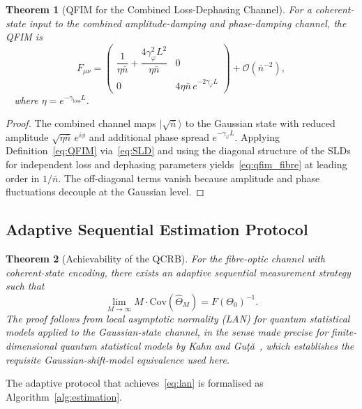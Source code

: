 \documentclass[journal,twocolumn]{IEEEtran}
\theoremstyle{definition}
\theoremstyle{plain}
\newtheorem{theorem}{Theorem}[section]
\begin{document}
\begin{theorem}[QFIM for the Combined Loss-Dephasing Channel]
\label{thm:qfim_fibre}
For a coherent-state input to the combined amplitude-damping and
phase-damping channel, the QFIM is
\begin{equation}
  F_{\mu\nu} =
  \begin{pmatrix}
    \dfrac{1}{\eta\bar n} + \dfrac{4\gamma_\varphi^2 L^2}{\eta\bar n}
    & 0 \\[8pt]
    0 & 4\eta\bar n\,e^{-2\gamma_\varphi L}
  \end{pmatrix}
  + \mathcal{O}(\bar n^{-2}),
  \label{eq:qfim_fibre}
\end{equation}\
\centering
where $\eta = e^{-\gamma_{\mathrm{loss}} L}$.
\end{theorem}

\begin{proof}
The combined channel maps $|\sqrt{\bar n}\rangle$ to the Gaussian
state with reduced amplitude $\sqrt{\eta\bar n}\,e^{i\phi}$ and
additional phase spread $e^{-\gamma_\varphi L}$.  Applying
Definition~\ref{eq:QFIM} via~\eqref{eq:SLD} and using the diagonal
structure of the SLDs for independent loss and dephasing parameters
yields~\eqref{eq:qfim_fibre} at leading order in $1/\bar n$.  The
off-diagonal terms vanish because amplitude and phase fluctuations
decouple at the Gaussian level.
\end{proof}

\subsection{Adaptive Sequential Estimation Protocol}

\begin{theorem}[Achievability of the QCRB]
\label{thm:qcrb_achieve}
For the fibre-optic channel with coherent-state encoding, there
exists an adaptive sequential measurement strategy such that
\begin{equation}
  \lim_{M\to\infty} M\cdot \mathrm{Cov}(\hat\Theta_M) =
  F(\Theta_0)^{-1}.
  \label{eq:lan}
\end{equation}
The proof follows from local asymptotic normality (LAN) for
quantum statistical models applied to the Gaussian-state channel,
in the sense made precise for finite-dimensional quantum statistical
models by Kahn and Gu\c{t}\u{a}~\cite{kahnguta2009}, which
establishes the requisite Gaussian-shift-model equivalence used
here.
\end{theorem}

The adaptive protocol that achieves~\eqref{eq:lan} is formalised
as Algorithm~\ref{alg:estimation}.
\end{document}
